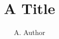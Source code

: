 \documentclass{an}

\title{A Title}
\author{A. Author}
\begin{abstract}
We consider the contribution of microlensing.
\end{abstract}
\maketitle
\section{Introduction}
Body text.

